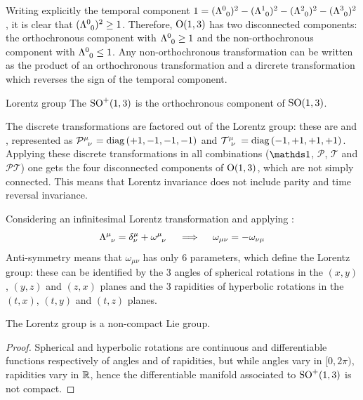Writing explicitly the temporal component $ 1 = (\tensor{\Lambda}{^0_0})^2 - (\tensor{\Lambda}{^1_0})^2 - (\tensor{\Lambda}{^2_0})^2 - (\tensor{\Lambda}{^3_0})^2 $, it is clear that $ (\tensor{\Lambda}{^0_0})^2 \ge 1 $. Therefore, $ \mathrm{O}(1,3) $ has two disconnected components: the orthochronous component with $ \tensor{\Lambda}{^0_0} \ge 1 $ and the non-orthochronous component with $ \tensor{\Lambda}{^0_0} \le 1 $. Any non-orthochronous transformation can be written as the product of an orthochronous transformation and a dircrete transformation which reverses the sign of the temporal component.

\begin{definition}{Lorentz group}{}
  The  $ \mathrm{SO}^+(1,3) $ is the orthochronous component of $ \mathrm{SO}(1,3) $.
\end{definition}

The discrete transformations are factored out of the Lorentz group: these are  and , represented as $ \tensor{\mathcal{P}}{^\mu_\nu} = \diag \left( +1,-1,-1,-1 \right) $ and $ \tensor{\mathcal{T}}{^\mu_\nu} = \diag \left( -1,+1,+1,+1 \right) $. Applying these discrete transformations in all combinations ($ \id $, $ \mathcal{P} $, $ \mathcal{T} $ and $ \mathcal{P} \mathcal{T} $) one gets the four disconnected components of $ \mathrm{O}(1,3) $, which are not simply connected. This means that Lorentz invariance does not include parity and time reversal invariance.

Considering an infinitesimal Lorentz transformation and applying :
\begin{equation*}
  \tensor{\Lambda}{^\mu_\nu} = \delta^\mu_\nu + \tensor{\omega}{^\mu_\nu}
  \quad \implies \quad
  \omega_{\mu \nu} = - \omega_{\nu \mu}
\end{equation*}
Anti-symmetry means that $ \omega_{\mu \nu} $ has only 6 parameters, which define the Lorentz group: these can be identified by the 3 angles of spherical rotations in the $ (x,y) $, $ (y,z) $ and $ (z,x) $ planes and the 3 rapidities of hyperbolic rotations in the $ (t,x) $, $ (t,y) $ and $ (t,z) $ planes.

\begin{proposition}{}{}
  The Lorentz group is a non-compact Lie group.
\end{proposition}

\begin{proofbox}
  \begin{proof}
    Spherical and hyperbolic rotations are continuous and differentiable functions respectively of angles and of rapidities, but while angles vary in $ [0, 2\pi) $, rapidities vary in $ \mathbb{R} $, hence the differentiable manifold associated to $ \mathrm{SO}^+(1,3) $ is not compact.
  \end{proof}
\end{proofbox}

